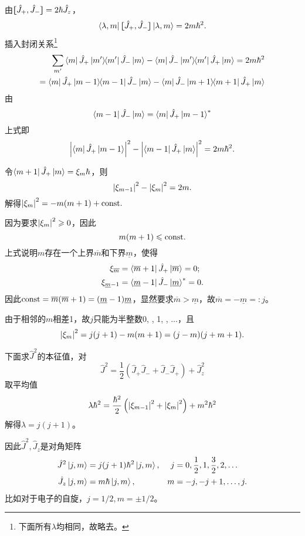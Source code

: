 由$\cmm{J_+}{J_-}=2\hbar\hat J_z$，
\[\bra{\lambda,m}\cmm{J_+}{J_-}\ket{\lambda,m}=2m\hbar^2.\]%
插入封闭关系\footnote{下面所有$\lambda$均相同，故略去。}
\begin{align*}
	\sum_{m'}\bra{m}\hat J_+\ktbr{m'}{m'}\hat J_-\ket{m}-\bra{m}\hat J_-\ktbr{m'}{m'}\hat J_+\ket{m}=2m\hbar^2\\
	=\bra{m}\hat J_+\ktbr{m-1}{m-1}\hat J_-\ket{m}-\bra{m}\hat J_-\ktbr{m+1}{m+1}\hat J_+\ket{m}
\end{align*}
由
\[\bra{m-1}\hat J_-\ket{m}=\bra{m}\hat J_+\ket{m-1}\cj\]
上式即
\begin{align}
	\abs{\bra{m}\hat J_+\ket{m-1}}^2-\abs{\bra{m-1}\hat J_+\ket{m}}^2=2m\hbar^2.
\end{align}

令$\bra{m+1}\hat J_+\ket{m}=\xi_m\hbar$，则 
\[\abs{\xi_{m-1}}^2-\abs{\xi_m}^2=2m.\]
解得$\abs{\xi_m}^2=-m(m+1)+\cns.$

因为要求$\abs{\xi_m}^2\geqslant 0$，因此 
\[m(m+1)\leqslant\cns.\]
上式说明$m$存在一个上界$\overline m$和下界$\underline m$，使得
\begin{align*}
	\xi_{\overline m}&=\bra{\overline m+1}\hat J_+\ket{\overline m}=0;\\
	\xi_{\underline m-1}&=\bra{\underline m-1}\hat J_-\ket{\underline m}\cj=0.
\end{align*}
因此$\cns=\overline m(\overline m+1)=(\underline m-1)\underline m$，显然要求$\overline m>\underline m$，故$\overline m=-\underline m=:j$。

由于相邻的$m$相差1，故$j$只能为半整数0, , 1, , $\ldots$，且
\[\abs{\xi_m}^2=j(j+1)-m(m+1)=(j-m)(j+m+1).\]

下面求$\hat J^2$的本征值，对
\[\hat J^2=\frac12(\hat J_+\hat J_-+\hat J_-\hat J_+)+\hat J_z^2\]
取平均值
\[\lambda\hbar^2=\frac{\hbar^2}2\kh{\abs{\xi_{m-1}}^2+\abs{\xi_m}^2}+m^2\hbar^2\]
解得$\lambda=j(j+1)$。

因此$\hat J^2,\hat J_z$是对角矩阵
\begin{align}
	\hat J^2\ket{j,m}&=j(j+1)\hbar^2\ket{j,m},&j&=0,\frac12,1,\frac32,2,\ldots\\
	\hat J_z\ket{j,m}&=m\hbar\ket{j,m},&m&=-j,-j+1,\ldots,j.
\end{align}
比如对于电子的自旋，$j=1/2,m=\pm 1/2$。

